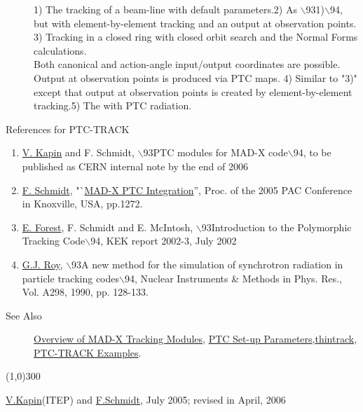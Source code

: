 \begin{description}
\begin{tabular}{cccccc}
\end{tabular}

1) The tracking of a beam-line with default parameters.2) As $\backslash$931)$\backslash$94, but with element-by-element tracking and an output 
   at observation points. 3) Tracking in a closed ring with closed orbit search and the 
   Normal Forms calculations. 
\\
   Both canonical and action-angle 
   input/output coordinates are possible. Output at observation 
   points is produced via PTC maps. 4) Similar to "3)" except that output at observation points is 
   created by element-by-element tracking.5) The with PTC radiation.

	\item[References for PTC-TRACK] 
\end{description}
\begin{enumerate}
	\item \href{V._Kapin}{V. Kapin} and F. Schmidt, $\backslash$93PTC modules for MAD-X code$\backslash$94, to be published as CERN internal note by the end of 
   2006
	\item \href{F._Schmidt}{F. Schmidt}, "`\href{http://cern.ch/madx/doc/MPPE012.pdf}{MAD-X PTC Integration}'', 
   Proc. of the 2005 PAC Conference in Knoxville, USA, pp.1272.
	\item \href{E._Forest}{E. Forest}, F. Schmidt and E. McIntosh, 
   $\backslash$93Introduction to the Polymorphic Tracking Code$\backslash$94, KEK report 2002-3, July 
   2002
	\item \href{G.J._Roy}{G.J. Roy}, $\backslash$93A new method for the simulation of 
   synchrotron radiation in particle tracking codes$\backslash$94, Nuclear Instruments \& 
   Methods in Phys. Res., Vol. A298, 1990, pp. 128-133.
\end{enumerate}
\begin{description}
	\item[See Also] \href{../tracking/tracking.html}{Overview of 
   MAD-X Tracking Modules},
   \href{../ptc_general/ptc_general.html}{PTC 
   Set-up Parameters},\texttt{}\href{../thintrack/thintrack.html}{thintrack},
   \href{http://cern.ch/frs/mad-X_examples/ptc_track}{PTC-TRACK 
   Examples}.
\end{description}

\line(1,0){300}

\href{mailto:kapin@itep.ru}{
 V.Kapin}(ITEP) and \href{mailto:Frank.Schmidt@cern.ch}{
 F.Schmidt}, July 2005; revised in April, 2006

